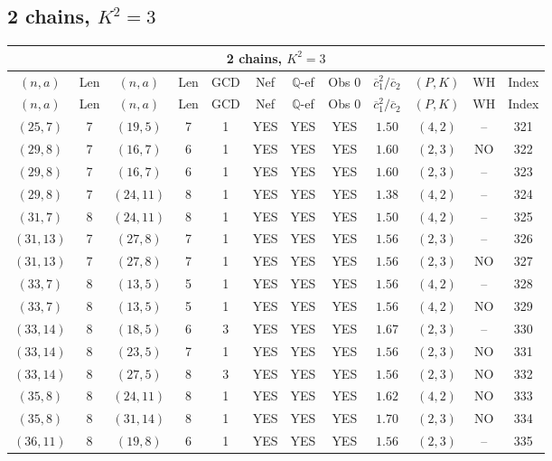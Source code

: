 \subsection{2 chains, $K^2 = 3$}
\begin{longtable}{|c|c|c|c|c|c|c|c|c|c|c|c|}
\hline
\multicolumn{12}{|c|}{2 chains, $K^2 = 3$}\\
\hline
$(n,a)$ & Len & $(n,a)$ & Len & GCD & Nef & $\mathbb Q$-ef & Obs 0 & $\overline c_1^2 / \overline c_2$ & $(P,K)$ & WH & Index\\
\hline
\endfirsthead

\hline
$(n,a)$ & Len & $(n,a)$ & Len & GCD & Nef & $\mathbb Q$-ef & Obs 0 & $\overline c_1^2 / \overline c_2$ & $(P,K)$ & WH & Index\\
\hline
\endhead
\hline
\endfoot

$(25,7)$ & 7 & $(19,5)$ & 7 & 1 & YES & YES & YES & $1.50$ & $(4,2)$ & -- & 321\\
$(29,8)$ & 7 & $(16,7)$ & 6 & 1 & YES & YES & YES & $1.60$ & $(2,3)$ & NO & 322\\
$(29,8)$ & 7 & $(16,7)$ & 6 & 1 & YES & YES & YES & $1.60$ & $(2,3)$ & -- & 323\\
$(29,8)$ & 7 & $(24,11)$ & 8 & 1 & YES & YES & YES & $1.38$ & $(4,2)$ & -- & 324\\
$(31,7)$ & 8 & $(24,11)$ & 8 & 1 & YES & YES & YES & $1.50$ & $(4,2)$ & -- & 325\\
$(31,13)$ & 7 & $(27,8)$ & 7 & 1 & YES & YES & YES & $1.56$ & $(2,3)$ & -- & 326\\
$(31,13)$ & 7 & $(27,8)$ & 7 & 1 & YES & YES & YES & $1.56$ & $(2,3)$ & NO & 327\\
$(33,7)$ & 8 & $(13,5)$ & 5 & 1 & YES & YES & YES & $1.56$ & $(4,2)$ & -- & 328\\
$(33,7)$ & 8 & $(13,5)$ & 5 & 1 & YES & YES & YES & $1.56$ & $(4,2)$ & NO & 329\\
$(33,14)$ & 8 & $(18,5)$ & 6 & 3 & YES & YES & YES & $1.67$ & $(2,3)$ & -- & 330\\
$(33,14)$ & 8 & $(23,5)$ & 7 & 1 & YES & YES & YES & $1.56$ & $(2,3)$ & NO & 331\\
$(33,14)$ & 8 & $(27,5)$ & 8 & 3 & YES & YES & YES & $1.56$ & $(2,3)$ & NO & 332\\
$(35,8)$ & 8 & $(24,11)$ & 8 & 1 & YES & YES & YES & $1.62$ & $(4,2)$ & NO & 333\\
$(35,8)$ & 8 & $(31,14)$ & 8 & 1 & YES & YES & YES & $1.70$ & $(2,3)$ & NO & 334\\
$(36,11)$ & 8 & $(19,8)$ & 6 & 1 & YES & YES & YES & $1.56$ & $(2,3)$ & -- & 335\\

\end{longtable}
